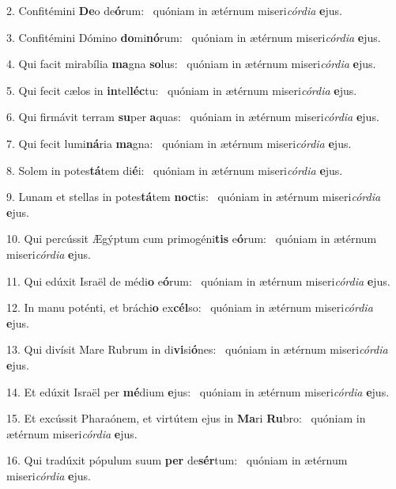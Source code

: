 2. Confitémini \textbf{De}o de\textbf{ó}rum: \ast\  quóniam in ætérnum miseri\textit{cór}\textit{di}\textit{a} \textbf{e}jus.\

3. Confitémini Dómino \textbf{do}mi\textbf{nó}rum: \ast\  quóniam in ætérnum miseri\textit{cór}\textit{di}\textit{a} \textbf{e}jus.\

4. Qui facit mirabília \textbf{ma}gna \textbf{so}lus: \ast\  quóniam in ætérnum miseri\textit{cór}\textit{di}\textit{a} \textbf{e}jus.\

5. Qui fecit cælos in \textbf{in}tel\textbf{léc}tu: \ast\  quóniam in ætérnum miseri\textit{cór}\textit{di}\textit{a} \textbf{e}jus.\

6. Qui firmávit terram \textbf{su}per \textbf{a}quas: \ast\  quóniam in ætérnum miseri\textit{cór}\textit{di}\textit{a} \textbf{e}jus.\

7. Qui fecit lumi\textbf{ná}ria \textbf{ma}gna: \ast\  quóniam in ætérnum miseri\textit{cór}\textit{di}\textit{a} \textbf{e}jus.\

8. Solem in potes\textbf{tá}tem di\textbf{é}i: \ast\  quóniam in ætérnum miseri\textit{cór}\textit{di}\textit{a} \textbf{e}jus.\

9. Lunam et stellas in potes\textbf{tá}tem \textbf{noc}tis: \ast\  quóniam in ætérnum miseri\textit{cór}\textit{di}\textit{a} \textbf{e}jus.\

10. Qui percússit Ægýptum cum primogéni\textbf{tis} e\textbf{ó}rum: \ast\  quóniam in ætérnum miseri\textit{cór}\textit{di}\textit{a} \textbf{e}jus.\

11. Qui edúxit Israël de médi\textbf{o} e\textbf{ó}rum: \ast\  quóniam in ætérnum miseri\textit{cór}\textit{di}\textit{a} \textbf{e}jus.\

12. In manu poténti, et bráchi\textbf{o} ex\textbf{cél}so: \ast\  quóniam in ætérnum miseri\textit{cór}\textit{di}\textit{a} \textbf{e}jus.\

13. Qui divísit Mare Rubrum in di\textbf{vi}si\textbf{ó}nes: \ast\  quóniam in ætérnum miseri\textit{cór}\textit{di}\textit{a} \textbf{e}jus.\

14. Et edúxit Israël per \textbf{mé}dium \textbf{e}jus: \ast\  quóniam in ætérnum miseri\textit{cór}\textit{di}\textit{a} \textbf{e}jus.\

15. Et excússit Pharaónem, et virtútem ejus in \textbf{Ma}ri \textbf{Ru}bro: \ast\  quóniam in ætérnum miseri\textit{cór}\textit{di}\textit{a} \textbf{e}jus.\

16. Qui tradúxit pópulum suum \textbf{per} de\textbf{sér}tum: \ast\  quóniam in ætérnum miseri\textit{cór}\textit{di}\textit{a} \textbf{e}jus.\

